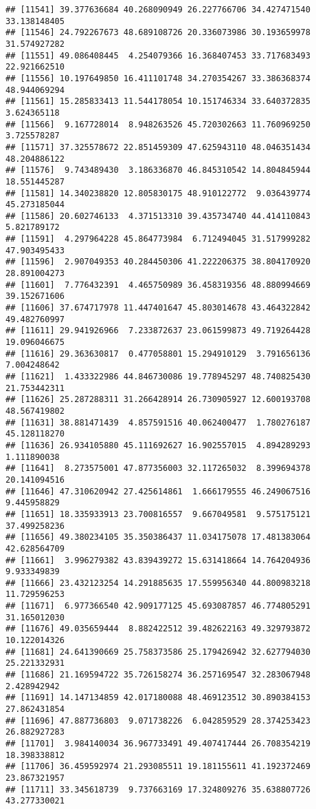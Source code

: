 \documentclass[
]{article}
\begin{document}
\begin{verbatim}
## [11541] 39.377636684 40.268090949 26.227766706 34.427471540 33.138148405
## [11546] 24.792267673 48.689108726 20.336073986 30.193659978 31.574927282
## [11551] 49.086408445  4.254079366 16.368407453 33.717683493 22.921662510
## [11556] 10.197649850 16.411101748 34.270354267 33.386368374 48.944069294
## [11561] 15.285833413 11.544178054 10.151746334 33.640372835  3.624365118
## [11566]  9.167728014  8.948263526 45.720302663 11.760969250  3.725578287
## [11571] 37.325578672 22.851459309 47.625943110 48.046351434 48.204886122
## [11576]  9.743489430  3.186336870 46.845310542 14.804845944 18.551445287
## [11581] 14.340238820 12.805830175 48.910122772  9.036439774 45.273185044
## [11586] 20.602746133  4.371513310 39.435734740 44.414110843  5.821789172
## [11591]  4.297964228 45.864773984  6.712494045 31.517999282 47.903495433
## [11596]  2.907049353 40.284450306 41.222206375 38.804170920 28.891004273
## [11601]  7.776432391  4.465750989 36.458319356 48.880994669 39.152671606
## [11606] 37.674717978 11.447401647 45.803014678 43.464322842 49.482760997
## [11611] 29.941926966  7.233872637 23.061599873 49.719264428 19.096046675
## [11616] 29.363630817  0.477058801 15.294910129  3.791656136  7.004248642
## [11621]  1.433322986 44.846730086 19.778945297 48.740825430 21.753442311
## [11626] 25.287288311 31.266428914 26.730905927 12.600193708 48.567419802
## [11631] 38.881471439  4.857591516 40.062400477  1.780276187 45.128118270
## [11636] 26.934105880 45.111692627 16.902557015  4.894289293  1.111890038
## [11641]  8.273575001 47.877356003 32.117265032  8.399694378 20.141094516
## [11646] 47.310620942 27.425614861  1.666179555 46.249067516  9.445958829
## [11651] 18.335933913 23.700816557  9.667049581  9.575175121 37.499258236
## [11656] 49.380234105 35.350386437 11.034175078 17.481383064 42.628564709
## [11661]  3.996279382 43.839439272 15.631418664 14.764204936  9.933349839
## [11666] 23.432123254 14.291885635 17.559956340 44.800983218 11.729596253
## [11671]  6.977366540 42.909177125 45.693087857 46.774805291 31.165012030
## [11676] 49.035659444  8.882422512 39.482622163 49.329793872 10.122014326
## [11681] 24.641390669 25.758373586 25.179426942 32.627794030 25.221332931
## [11686] 21.169594722 35.726158274 36.257169547 32.283067948  2.428942942
## [11691] 14.147134859 42.017180088 48.469123512 30.890384153 27.862431854
## [11696] 47.887736803  9.071738226  6.042859529 28.374253423 26.882927283
## [11701]  3.984140034 36.967733491 49.407417444 26.708354219 18.398338812
## [11706] 36.459592974 21.293085511 19.181155611 41.192372469 23.867321957
## [11711] 33.345618739  9.737663169 17.324809276 35.638807726 43.277330021

\end{verbatim}
\end{document}
